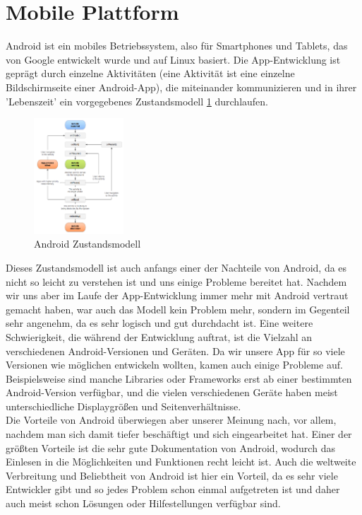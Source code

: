 \section{Mobile Plattform}
\label{sec:grundlagen:plattforml}

Android ist ein mobiles Betriebssystem, also für Smartphones und Tablets, das von Google entwickelt wurde und auf Linux basiert. Die App-Entwicklung ist geprägt durch einzelne Aktivitäten (eine Aktivität ist eine einzelne Bildschirmseite einer Android-App), die miteinander kommunizieren und in ihrer 'Lebenszeit' ein vorgegebenes Zustandsmodell \ref{figure:androidZustandsmodell} durchlaufen.

\begin{figure}[htp]
	\centering
  	\includegraphics[width=0.3\textwidth]{img/modelle/AndroidZustandsmodell.png}
	\caption[Android Zustandsmodell]{Android Zustandsmodell\protect\footnotemark}
	\label{figure:androidZustandsmodell}
\end{figure}

Dieses Zustandsmodell ist auch anfangs einer der Nachteile von Android, da es nicht so leicht zu verstehen ist und uns einige Probleme bereitet hat. Nachdem wir uns aber im Laufe der App-Entwicklung immer mehr mit Android vertraut gemacht haben, war auch das Modell kein Problem mehr, sondern im Gegenteil sehr angenehm, da es sehr logisch und gut durchdacht ist. Eine weitere Schwierigkeit, die während der Entwicklung auftrat, ist die Vielzahl an verschiedenen Android-Versionen und Geräten. Da wir unsere App für so viele Versionen wie möglichen entwickeln wollten, kamen auch einige Probleme auf. Beispielsweise sind manche Libraries oder Frameworks erst ab einer bestimmten Android-Version verfügbar, und die vielen verschiedenen Geräte haben meist unterschiedliche Displaygrößen und Seitenverhältnisse.\\
Die Vorteile von Android überwiegen aber unserer Meinung nach, vor allem, nachdem man sich damit tiefer beschäftigt und sich eingearbeitet hat. Einer der größten Vorteile ist die sehr gute Dokumentation von Android, wodurch das Einlesen in die Möglichkeiten und Funktionen recht leicht ist. Auch die weltweite Verbreitung und Beliebtheit von Android ist hier ein Vorteil, da es sehr viele Entwickler gibt und so jedes Problem schon einmal aufgetreten ist und daher auch meist schon Lösungen oder Hilfestellungen verfügbar sind.

